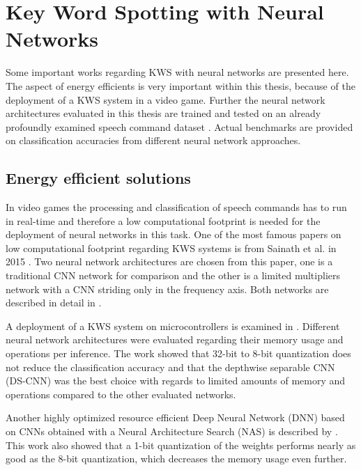 
\section{Key Word Spotting with Neural Networks}\label{sec:prev_kws}
\thesisStateRevised
Some important works regarding KWS with neural networks are presented here. 
The aspect of energy efficients is very important within this thesis, because of the deployment of a KWS system in a video game.
Further the neural network architectures evaluated in this thesis are trained and tested on an already profoundly examined speech command dataset \cite{Warden2018}.
Actual benchmarks are provided on classification accuracies from different neural network approaches.



\subsection{Energy efficient solutions}
In video games the processing and classification of speech commands has to run in real-time and therefore a low computational footprint is needed for the deployment of neural networks in this task.
One of the most famous papers on low computational footprint regarding KWS systems is from Sainath et al. in 2015 \cite{Sainath2015}.
Two neural network architectures are chosen from this paper, one is a traditional CNN network for comparison and the other is a limited multipliers network with a CNN striding only in the frequency axis.
Both networks are described in detail in .

A deployment of a KWS system on microcontrollers is examined in \cite{Zhang2017}.
Different neural network architectures were evaluated regarding their memory usage and operations per inference.
The work showed that 32-bit to 8-bit quantization does not reduce the classification accuracy and that the depthwise separable CNN (DS-CNN) was the best choice with regards to limited amounts of memory and operations compared to the other evaluated networks.

Another highly optimized resource efficient Deep Neural Network (DNN) based on CNNs obtained with a Neural Architecture Search (NAS) is described by \cite{Peter2020}.
This work also showed that a 1-bit quantization of the weights performs nearly as good as the 8-bit quantization, which decreases the memory usage even further.



